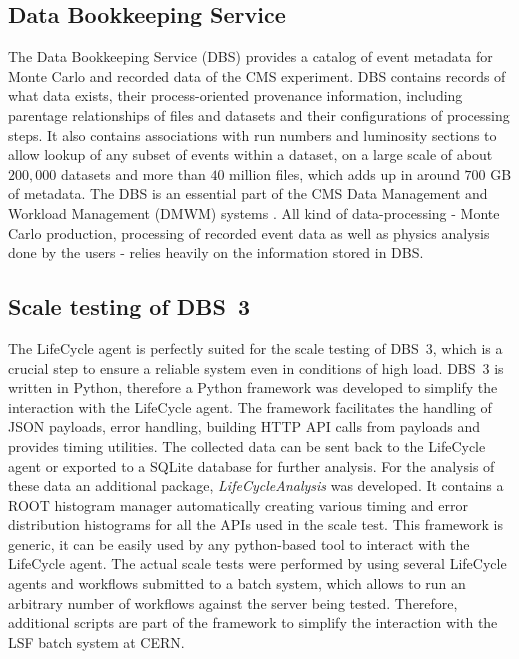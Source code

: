 \subsection{Data Bookkeeping Service}
The Data Bookkeeping Service (DBS) \cite{DBS} provides a catalog of event metadata for Monte Carlo and recorded data of the CMS experiment. DBS contains records of what data exists, their process-oriented provenance information, including parentage relationships of files and datasets and their configurations of processing steps. It also contains associations with run numbers and luminosity sections to allow lookup of any subset of events within a dataset, on a large scale of about $200,000$ datasets and more than $40$ million files, which adds up in around $700$ GB of metadata. The DBS is an essential part of the CMS Data Management and Workload Management (DMWM) systems \cite{CMSDMS}. All kind of data-processing - Monte Carlo production, processing of recorded event data as well as physics analysis done by the users - relies heavily on the information stored in DBS.

\subsection{Scale testing of DBS~3}
The LifeCycle agent is perfectly suited for the scale testing of DBS~3, which is a crucial step to ensure a reliable system even in conditions of high load. DBS~3 is written in Python, therefore a Python framework was developed to simplify the interaction with the LifeCycle agent. The framework facilitates the handling of JSON payloads, error handling, building HTTP API calls from payloads and provides timing utilities. The collected data can be sent back to the LifeCycle agent or exported to a SQLite database for further analysis. For the analysis of these data an additional package, {\it LifeCycleAnalysis} was developed. It contains a ROOT histogram manager automatically creating various timing and error distribution histograms for all the APIs used in the scale test. This framework is generic, it can be easily used by any python-based tool to interact with the LifeCycle agent. The actual scale tests were performed by using several LifeCycle agents and workflows submitted to a batch system, which allows to run an arbitrary number of workflows against the server being tested. Therefore, additional scripts are part of the framework to simplify the interaction with the LSF batch system at CERN.
